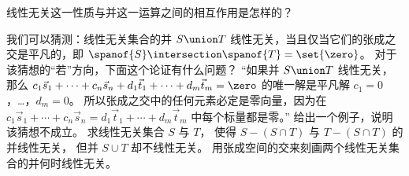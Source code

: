     线性无关这一性质与并这一运算之间的相互作用是怎样的？
    \begin{exparts}
       \partsitem 我们可以猜测：线性无关集合的并 $S\union T$ 线性无关，当且仅当它们的张成之交是平凡的，即 $\spanof{S}\intersection \spanof{T}=\set{\zero}$。
          对于该猜想的“若”方向，下面这个论证有什么问题？
          “如果并 $S\union T$ 线性无关，那么
          $c_1\vec{s}_1+\cdots+c_n\vec{s}_n
            +d_1\vec{t}_1+\cdots+d_m\vec{t}_m
            =\zero$
          的唯一解是平凡解 $c_1=0$，\ldots，$d_m=0$。
          所以张成之交中的任何元素必定是零向量，因为在
          $c_1\vec{s}_1+\cdots+c_n\vec{s}_n
            =d_1\vec{t}_1+\cdots+d_m\vec{t}_m$
          中每个标量都是零。”
       \partsitem 给出一个例子，说明该猜想不成立。
       \partsitem 求线性无关集合 \( S \) 与 \( T \)，
          使得 \( S-(S\cap T)\) 与 \( T-(S\cap T) \) 的并线性无关，
          但并 \( S\cup T \) 却不线性无关。
       \partsitem 用张成空间的交来刻画两个线性无关集合的并何时线性无关。
    \end{exparts}
